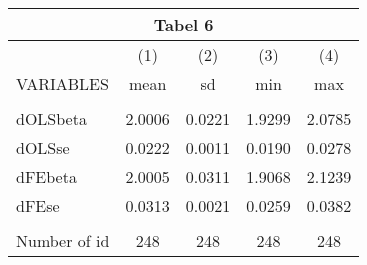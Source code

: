 \documentclass[]{article}
\begin{document}
\begin{tabular}{lcccc}
\multicolumn{5}{c}{Tabel 6} \\ \hline
 & (1) & (2) & (3) & (4) \\
VARIABLES & mean & sd & min & max \\ \hline
 &  &  &  &  \\
dOLSbeta & 2.0006 & 0.0221 & 1.9299 & 2.0785 \\
dOLSse & 0.0222 & 0.0011 & 0.0190 & 0.0278 \\
dFEbeta & 2.0005 & 0.0311 & 1.9068 & 2.1239 \\
dFEse & 0.0313 & 0.0021 & 0.0259 & 0.0382 \\
 &  &  &  &  \\
 Number of id & 248 & 248 & 248 & 248 \\ \hline
\end{tabular}
\end{document}
